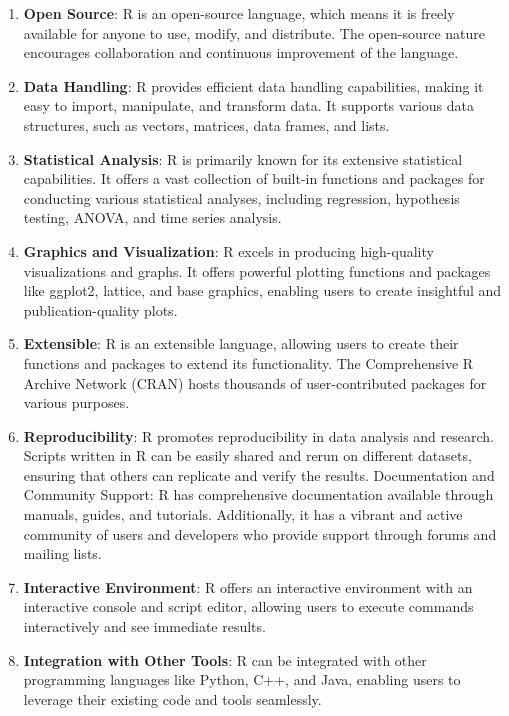 \documentclass[
]{article}
\providecommand{\tightlist}{%
  \setlength{\itemsep}{0pt}\setlength{\parskip}{0pt}}
\begin{document}
\begin{enumerate}
\def\labelenumi{\arabic{enumi}.}
\tightlist
\item
  \textbf{Open Source}: R is an open-source language, which means it is
  freely available for anyone to use, modify, and distribute. The
  open-source nature encourages collaboration and continuous improvement
  of the language.
\item
  \textbf{Data Handling}: R provides efficient data handling
  capabilities, making it easy to import, manipulate, and transform
  data. It supports various data structures, such as vectors, matrices,
  data frames, and lists.
\item
  \textbf{Statistical Analysis}: R is primarily known for its extensive
  statistical capabilities. It offers a vast collection of built-in
  functions and packages for conducting various statistical analyses,
  including regression, hypothesis testing, ANOVA, and time series
  analysis.
\item
  \textbf{Graphics and Visualization}: R excels in producing
  high-quality visualizations and graphs. It offers powerful plotting
  functions and packages like ggplot2, lattice, and base graphics,
  enabling users to create insightful and publication-quality plots.
\item
  \textbf{Extensible}: R is an extensible language, allowing users to
  create their functions and packages to extend its functionality. The
  Comprehensive R Archive Network (CRAN) hosts thousands of
  user-contributed packages for various purposes.
\item
  \textbf{Reproducibility}: R promotes reproducibility in data analysis
  and research. Scripts written in R can be easily shared and rerun on
  different datasets, ensuring that others can replicate and verify the
  results. Documentation and Community Support: R has comprehensive
  documentation available through manuals, guides, and tutorials.
  Additionally, it has a vibrant and active community of users and
  developers who provide support through forums and mailing lists.
\item
  \textbf{Interactive Environment}: R offers an interactive environment
  with an interactive console and script editor, allowing users to
  execute commands interactively and see immediate results.
\item
  \textbf{Integration with Other Tools}: R can be integrated with other
  programming languages like Python, C++, and Java, enabling users to
  leverage their existing code and tools seamlessly.
\end{enumerate}
\end{document}
